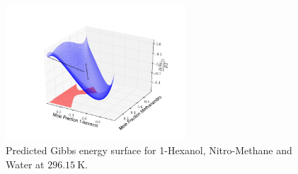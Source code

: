 \begin{figure}[hp]
\centering
\includegraphics[width = 0.6\textwidth, bb=100 0 500 400]{Results_Parts/TernaryParams/1-hexanol-methanenitro-water/DWPM/296.15/PredictedGibbsWireframe.png}
\caption{Predicted Gibbs energy surface for 1-Hexanol, Nitro-Methane and Water at $296.15~\mathrm{K}$.}
\end{figure}

